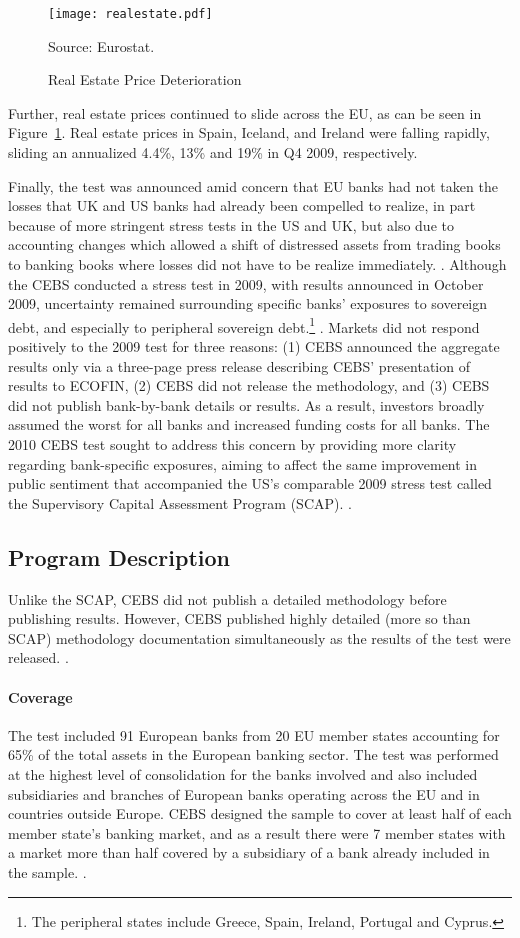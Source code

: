 \documentclass[12pt]{article}
\begin{document}
\begin{figure}[h]
\caption{Real Estate Price Deterioration}\label{figure2}
\centering
\texttt{[image: realestate.pdf]}
\raggedright
\footnotesize Source: Eurostat.
\end{figure}

Further, real estate prices continued to slide across the EU, as can be seen in Figure~\ref{figure2}. Real estate prices in Spain, Iceland, and Ireland were falling rapidly, sliding an annualized 4.4\%, 13\% and 19\% in Q4 2009, respectively.

Finally, the test was announced amid concern that EU banks had not taken the losses that UK and US banks had already been compelled to realize, in part because of more stringent stress tests in the US and UK, but also due to accounting changes which allowed a shift of distressed assets from trading books to banking books where losses did not have to be realize immediately. \citep{Sunderji}. Although the CEBS conducted a stress test in 2009, with results announced in October 2009, uncertainty remained surrounding specific banks' exposures to sovereign debt, and especially to peripheral sovereign debt.\footnote{The peripheral states include Greece, Spain, Ireland, Portugal and Cyprus.} \citep{CEBSOctober2009}. Markets did not respond positively to the 2009 test for three reasons: (1) CEBS announced the aggregate results only via a three-page press release describing CEBS' presentation of results to ECOFIN, (2) CEBS did not release the methodology, and (3) CEBS did not publish bank-by-bank details or results. As a result, investors broadly assumed the worst for all banks and increased funding costs for all banks. The 2010 CEBS test sought to address this concern by providing more clarity regarding bank-specific exposures, aiming to affect the same improvement in public sentiment that accompanied the US's comparable 2009 stress test called the Supervisory Capital Assessment Program (SCAP). \citep{Goldman}.

\subsection{Program Description}

Unlike the SCAP, CEBS did not publish a detailed methodology before publishing results. However, CEBS published highly detailed (more so than SCAP) methodology documentation simultaneously as the results of the test were released. \citep{Methodology}.

\paragraph{Coverage} The test included 91 European banks from 20 EU member states accounting for 65\% of the total assets in the European banking sector. The test was performed at the highest level of consolidation for the banks involved and also included subsidiaries and branches of European banks operating across the EU and in countries outside Europe. CEBS designed the sample to cover at least half of each member state's banking market, and as a result there were 7 member states with a market more than half covered by a subsidiary of a bank already included in the sample. \citep{Methodology}.
\end{document}
